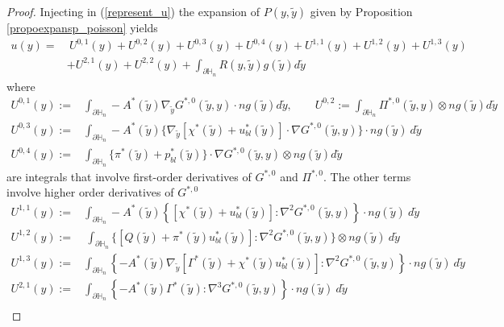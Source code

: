 \documentclass[11pt, reqno]{amsart}
\theoremstyle{definition}
\theoremstyle{remark}
\numberwithin{equation}{section}
\begin{document}
	
	
	\begin{proof}[Proof]
		Injecting in (\ref{represent_u}) the expansion of $P(y,\tilde{y})$ given by Proposition \ref{propoexpansp_poisson}  yields
		\begin{align}
			u(y)=&\: U^{0,1}(y) +U^{0,2}(y) +U^{0,3}(y) +U^{0,4}(y) +U^{1,1}(y) +U^{1,2}(y) +U^{1,3}(y) \nonumber\\
			& +U^{2,1}(y) +U^{2,2}(y) +\int_{\partial\mathbb{H}_n} R(y,\tilde{y}) g(\tilde{y}) d\tilde{y}\label{expans_u}
		\end{align}
		where 	
		\begin{align*}
			U^{0,1}(y):=&\int_{\partial\mathbb{H}_n}  -A^*(\tilde{y}) \nabla_{\!\tilde{y}}G^{*,0}\left(\tilde{y},y \right)\cdot n g(\tilde{y})  d\tilde{y},   \qquad U^{0,2}:=\int_{\partial\mathbb{H}_n}\Pi^{*,0}( \tilde{y}, y)\otimes n g(\tilde{y})  d\tilde{y}  \nonumber \\
			U^{0,3}(y):=&\int_{\partial\mathbb{H}_n}-A^*(\tilde{y}) \{\nabla_{\!\tilde{y}}\left[\chi^* \left(\tilde{y} \right)+ u^*_{bl}\left(\tilde{y} \right)\right]\cdot  \nabla G^{*,0}\left(\tilde{y},y\right)\}\cdot n g(\tilde{y}) \   d\tilde{y}   \nonumber\\
			U^{0,4}(y):=& \int_{\partial\mathbb{H}_n}\{\pi^*(\tilde{y})+   p^*_{bl}(\tilde{y}) \} \cdot \nabla G^{*,0}(\tilde{y}, y)\otimes n  g(\tilde{y}) d\tilde{y} \nonumber
		\end{align*}
		are integrals that involve first-order derivatives of $G^{*,0}$ and $\Pi^{*,0}$. The other terms involve higher order derivatives of $G^{*,0}$
		\begin{align*}
			U^{1,1}(y):=&\int_{\partial\mathbb{H}_n}-A^*(\tilde{y}) \left\{\left[\chi^* \left(\tilde{y} \right)+ u_{bl}^*\left(\tilde{y} \right)\right]:\nabla^2 G^{*,0}\left(\tilde{y},y\right)\right\}\cdot n  g(\tilde{y}) \   d\tilde{y}  \nonumber \\
			U^{1,2}(y):=&\ \int_{\partial\mathbb{H}_n}\{[Q(\tilde{y})+\pi^* (\tilde{y})u_{bl}^*(\tilde{y})]:\nabla^2 G^{*,0}(\tilde{y}, y)\}\otimes n g(\tilde{y}) \ d\tilde{y} \nonumber\\
			U^{1,3}(y):=&\int_{\partial\mathbb{H}_n}  \left\{-A^*(\tilde{y}) \nabla_{\!\tilde{y}}\left[\Gamma^* \left(\tilde{y}\right)+ \chi^*\left(\tilde{y} \right) u_{bl}^*\left(\tilde{y} \right)\right]:\nabla^2 G^{*,0}\left(\tilde{y},y \right) 	\right\}\cdot n g(\tilde{y})   \  d\tilde{y}   \\
			U^{2,1}(y):=&\int_{\partial\mathbb{H}_n}  \left\{-A^*(\tilde{y}) \Gamma^* (\tilde{y}):\nabla^3 G^{*,0}\left(\tilde{y},y \right) 	\right\}\cdot n g(\tilde{y})   \  d\tilde{y} \nonumber  \\

\end{align*}
\end{proof}
\end{document}
